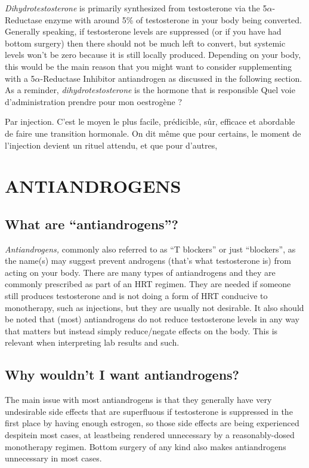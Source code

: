 \documentclass{article}
\begin{document}
{{\textit{Dihydrotestosterone} is primarily synthesized from testosterone via the 5$\alpha$-Reductase enzyme with around 5\% of testosterone in your body being converted. Generally speaking, if testosterone levels are suppressed (or if you have had bottom surgery) then there should not be much left to convert, but systemic levels won’t be zero because it is still locally produced. Depending on your body, this would be the main reason that you might want to consider supplementing with a 5$\alpha$-Reductase Inhibitor antiandrogen as discussed in the following section. As a reminder, \textit{dihydrotestosterone }is the hormone that is responsible Quel voie d'administration prendre pour mon oestrogène ?

Par injection. C'est le moyen le plus facile, prédicible, sûr, efficace et abordable de faire une transition hormonale. On dit même que pour certains, le moment de l'injection devient un rituel attendu, et que pour d'autres,  
\section{ANTIANDROGENS}\label{AA}

\subsection{What are “antiandrogens”?}

\textit{Antiandrogens, }commonly also referred to as “T blockers” or just “blockers”, as the name(s) may suggest prevent androgens (that’s what testosterone is) from acting on your body. There are many types of antiandrogens and they are commonly prescribed as part of an HRT regimen. They are needed if someone still produces testosterone and is not doing a form of HRT conducive to monotherapy, such as injections, but they are usually not desirable. It also should be noted that (most) antiandrogens do not reduce testosterone levels in any way that matters but instead simply reduce/negate effects on the body. This is relevant when interpreting lab results and such.

\subsection{Why wouldn’t I want antiandrogens?}

The main issue with most antiandrogens is that they generally have very undesirable side effects that are superfluous if testosterone is suppressed in the first place by having enough estrogen, so those side effects are being experienced despite\textemdash{}in most cases, at least\textemdash{}being rendered unnecessary by a reasonably-dosed monotherapy regimen. Bottom surgery of any kind also makes antiandrogens unnecessary in most cases.

}}
\end{document}
